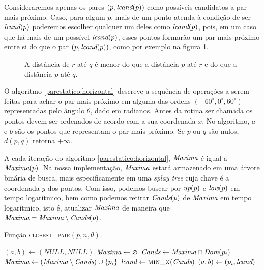 Consideraremos apenas os pares $(p, \textit{lcand}(p))$ como possíveis candidatos a
par mais próximo. Caso, para algum $p$, mais de um ponto atenda à condição
de ser $\textit{lcand}(p)$ poderemos escolher qualquer um deles como $\textit{lcand}(p)$,
pois, em um caso que há mais de um possível $\textit{lcand}(p)$, esses pontos
formarão um par mais próximo entre si do que o par $(p, \textit{lcand}(p))$, como
por exemplo na figura \ref{fig:parestatico:lcands}.
\begin{figure}
    \centering
    \caption{A distância de $r$ até $q$ é menor do que a
    distância $p$ até $r$ e do que a distância $p$ até $q$.}
    \label{fig:parestatico:lcands}
\end{figure}

O algoritmo \ref{parestatico:horizontal} descreve a sequência de operações a
serem feitas para achar o par mais próximo em alguma das ordens $(-60^\circ,
0^\circ, 60^\circ)$ representadas pelo ângulo $\theta$, dado em radianos.
Antes da rotina ser chamada os pontos devem ser ordenados de acordo com a
sua coordenada $x$. No algoritmo, $a$ e $b$ são os pontos que representam o
par mais próximo. Se $p$ ou $q$ são nulos, $d(p,q)$ retorna $+\infty$.

A cada iteração do algoritmo \ref{parestatico:horizontal}, $\textit{Maxima}$ é igual
a $\textit{Maxima}(p)$. Na nossa implementação, $\textit{Maxima}$ estará armazenado em uma
árvore binária de busca, mais especificamente em uma \textit{splay tree}
cuja chave é a coordenada $y$ dos pontos. Com isso, podemos buscar por
$\textit{up}(p)$ e $\textit{low}(p)$ em tempo logarítmico, bem como podemos retirar
$\textit{Cands}(p)$ de $\textit{Maxima}$ em tempo logarítmico, isto é, atualizar $\textit{Maxima}$
de maneira que $\textit{Maxima} = \textit{Maxima} \setminus \textit{Cands}(p)$.

\begin{algorithm}[H]
    \caption{Função \textsc{closest\_pair}$(p, n, \theta)$.}
    \label{parestatico:horizontal}
\begin{algorithmic}[1]
        \State $(a,b) \leftarrow (NULL, NULL)$
        \State {} 
        \State $\textit{Maxima} \leftarrow \varnothing$
            \State $\textit{Cands} \leftarrow \textit{Maxima}\cap \textit{Dom}(p_i)$
            \State $\textit{Maxima} \leftarrow (\textit{Maxima} \setminus \textit{Cands}) \cup \left\{ p_i\right\}$
            \State $\lcand \leftarrow \Call{min\_x}{\Cands}$
                \State $(a, b) \leftarrow (p_i, \textit{lcand})$
            \EndIf
        \EndFor
        \State {}
    \EndFunction
\end{algorithmic}
\end{algorithm}


